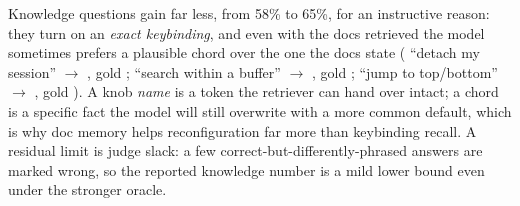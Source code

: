 Knowledge questions gain far less, from 58\% to 65\%, for an instructive reason: they
turn on an \emph{exact keybinding}, and even with the docs retrieved the model sometimes
prefers a plausible chord over the one the docs state ( ``detach my session''
$\rightarrow$ , gold ;  ``search within a buffer''
$\rightarrow$ , gold ;  ``jump to top/bottom''
$\rightarrow$ , gold ). A knob \emph{name} is a token the
retriever can hand over intact; a chord is a specific fact the model will still overwrite
with a more common default, which is why doc memory helps reconfiguration far more than
keybinding recall. A residual limit is judge slack: a few correct-but-differently-phrased
answers are marked wrong, so the reported knowledge number is a mild lower bound even
under the stronger  oracle.
